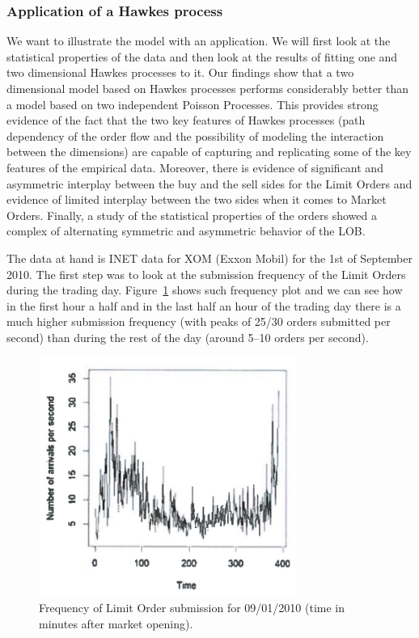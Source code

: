 \subsubsection{Application of a Hawkes process}


We want to illustrate the model with an application. We will first look at the statistical properties of the data and then look at the results of fitting one and two dimensional Hawkes processes to it. Our findings show that a two dimensional model based on Hawkes processes performs considerably better than a model based on two independent Poisson Processes. This provides strong evidence of the fact that the two key features of Hawkes processes (path dependency of the order flow and the possibility of modeling the interaction between the dimensions) are capable of capturing and replicating some of the key features of the empirical data. Moreover, there is evidence of significant and asymmetric interplay between the buy and the sell sides for the Limit Orders and evidence of limited interplay between the two sides when it comes to Market Orders. Finally, a study of the statistical properties of the orders showed a complex of alternating symmetric and asymmetric behavior of the LOB. 


The data at hand is INET data for XOM (Exxon Mobil) for the 1st of September 2010. The first step was to look at the submission frequency of the Limit Orders during the trading day. Figure~\ref{fig:freqsubmitarrivals} shows such frequency plot and we can see how in the first hour a half and in the last half an hour of the trading day there is a much higher submission frequency (with peaks of 25/30 orders submitted per second) than during the rest of the day (around 5--10 orders per second).
	\begin{figure}[!ht]
   	\centering
   	\includegraphics[width=0.75\textwidth]{chapters/chapter_trade_data_models/figures/freqsubmit.png} 
   	\caption{Frequency of Limit Order submission for 09/01/2010 (time in minutes after market opening). \label{fig:freqsubmitarrivals}}
	\end{figure}


